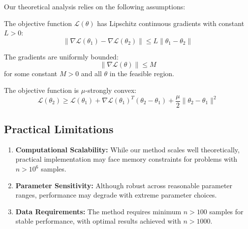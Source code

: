 Our theoretical analysis relies on the following assumptions:

\begin{assumption}
\label{ass:lipschitz}
The objective function $\mathcal{L}(\theta)$ has Lipschitz continuous gradients with constant $L > 0$:
\begin{equation}
\|\nabla \mathcal{L}(\theta_1) - \nabla \mathcal{L}(\theta_2)\| \leq L \|\theta_1 - \theta_2\|
\end{equation}
\end{assumption}

\begin{assumption}
\label{ass:bounded_gradients}
The gradients are uniformly bounded:
\begin{equation}
\|\nabla \mathcal{L}(\theta)\| \leq M
\end{equation}
for some constant $M > 0$ and all $\theta$ in the feasible region.
\end{assumption}

\begin{assumption}
\label{ass:strong_convexity}
The objective function is $\mu$-strongly convex:
\begin{equation}
\mathcal{L}(\theta_2) \geq \mathcal{L}(\theta_1) + \nabla \mathcal{L}(\theta_1)^T(\theta_2 - \theta_1) + \frac{\mu}{2}\|\theta_2 - \theta_1\|^2
\end{equation}
\end{assumption}

\subsection{Practical Limitations}
\label{app:practical_limitations}

\begin{enumerate}
    \item \textbf{Computational Scalability:} While our method scales well theoretically, practical implementation may face memory constraints for problems with $n > 10^6$ samples.
    
    \item \textbf{Parameter Sensitivity:} Although robust across reasonable parameter ranges, performance may degrade with extreme parameter choices.
    
    \item \textbf{Data Requirements:} The method requires minimum $n > 100$ samples for stable performance, with optimal results achieved with $n > 1000$.
\end{enumerate}
